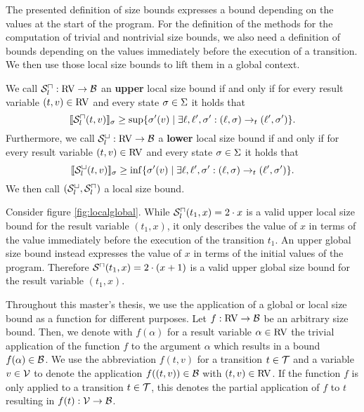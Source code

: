 The presented definition of size bounds expresses a bound depending on the values at the start of the program.
For the definition of the methods for the computation of trivial and nontrivial size bounds, we also need a definition of bounds depending on the values immediately before the execution of a transition.
We then use those local size bounds to lift them in a global context.

\begin{definition}
  We call ${\mathcal{S}^\sqcap_l}: \text{RV} \rightarrow \mathcal{B}$ an \textbf{upper} local size bound if and only if for every result variable $(t, v) \in \text{RV}$ and every state $\sigma \in \Sigma$ it holds that
  \[ \llbracket {\mathcal{S}^\sqcap_l}(t, v) \rrbracket_{\sigma} \geq \sup \lbrace \sigma'(v) \mid \exists \ell, \ell', \sigma': (\ell, \sigma) \rightarrow_t (\ell', \sigma') \rbrace. \]
  Furthermore, we call ${\mathcal{S}^\sqcup_l}: \text{RV} \rightarrow \mathcal{B}$ a \textbf{lower} local size bound if and only if for every result variable $(t, v) \in \text{RV}$ and every state $\sigma \in \Sigma$ it holds that
  \[ \llbracket {\mathcal{S}^\sqcup_l}(t, v) \rrbracket_{\sigma} \geq \inf \lbrace \sigma'(v) \mid \exists \ell, \ell', \sigma': (\ell, \sigma) \rightarrow_t (\ell', \sigma') \rbrace. \]
  We then call ${({\mathcal{S}^\sqcup_l}, {\mathcal{S}^\sqcap_l})}$ a local size bound.
\end{definition}



Consider figure \ref{fig:localglobal}.
While ${\mathcal{S}^\sqcap_l}(t_1, x) = 2 \cdot x$ is a valid upper local size bound for the result variable $(t_1, x)$, it only describes the value of $x$ in terms of the value immediately before the execution of the transition $t_1$.
An upper global size bound instead expresses the value of $x$ in terms of the initial values of the program.
Therefore ${\mathcal{S}^\sqcap}(t_1, x) = 2 \cdot (x + 1)$ is a valid upper global size bound for the result variable $(t_1, x)$.

Throughout this master's thesis, we use the application of a global or local size bound as a function for different purposes.
Let $f: \text{RV} \rightarrow \mathcal{B}$ be an arbitrary size bound.
Then, we denote with $f(\alpha)$ for a result variable $\alpha \in \text{RV}$ the trivial application of the function $f$ to the argument $\alpha$ which results in a bound $f(\alpha) \in \mathcal{B}$.
We use the abbreviation $f(t, v)$ for a transition $t \in \mathcal{T}$ and a variable $v \in \mathcal{V}$ to denote the application $f((t,v)) \in \mathcal{B}$ with $(t,v) \in \text{RV}$.
If the function $f$ is only applied to a transition $t \in \mathcal{T}$, this denotes the partial application of $f$ to $t$ resulting in $f(t): \mathcal{V} \rightarrow \mathcal{B}$.

